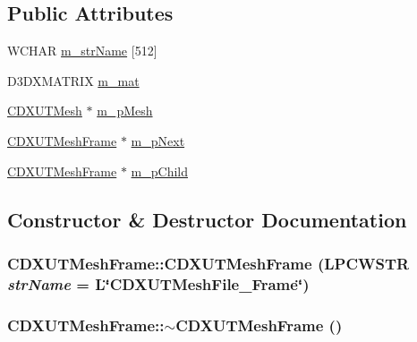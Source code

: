 \subsection*{Public Attributes}
\begin{DoxyCompactItemize}
\item 
WCHAR \hyperlink{class_c_d_x_u_t_mesh_frame_a7b42eefd652a2b8003644b8637f5209b}{m\_\-strName} \mbox{[}512\mbox{]}
\item 
D3DXMATRIX \hyperlink{class_c_d_x_u_t_mesh_frame_a018ba8d719db33f300d59b99bf0dfd86}{m\_\-mat}
\item 
\hyperlink{class_c_d_x_u_t_mesh}{CDXUTMesh} $\ast$ \hyperlink{class_c_d_x_u_t_mesh_frame_ade192a1107df2f8cf1463c8c84dbc145}{m\_\-pMesh}
\item 
\hyperlink{class_c_d_x_u_t_mesh_frame}{CDXUTMeshFrame} $\ast$ \hyperlink{class_c_d_x_u_t_mesh_frame_ab462f3935c9bb4308aeb377a225527f7}{m\_\-pNext}
\item 
\hyperlink{class_c_d_x_u_t_mesh_frame}{CDXUTMeshFrame} $\ast$ \hyperlink{class_c_d_x_u_t_mesh_frame_afc98448a89a6ac9eb9c9627e557fd37d}{m\_\-pChild}
\end{DoxyCompactItemize}


\subsection{Constructor \& Destructor Documentation}
\hypertarget{class_c_d_x_u_t_mesh_frame_a380a7768fe207481cfac4014f6eba973}{
\subsubsection[{CDXUTMeshFrame}]{\setlength{\rightskip}{0pt plus 5cm}CDXUTMeshFrame::CDXUTMeshFrame (LPCWSTR {\em strName} = {\ttfamily L\char`\"{}CDXUTMeshFile\_\-Frame\char`\"{}})}}
\label{class_c_d_x_u_t_mesh_frame_a380a7768fe207481cfac4014f6eba973}
\hypertarget{class_c_d_x_u_t_mesh_frame_ab6f087fc03f1af6f082a6fbd22c39a17}{
\subsubsection[{$\sim$CDXUTMeshFrame}]{\setlength{\rightskip}{0pt plus 5cm}CDXUTMeshFrame::$\sim$CDXUTMeshFrame ()}}
\label{class_c_d_x_u_t_mesh_frame_ab6f087fc03f1af6f082a6fbd22c39a17}


